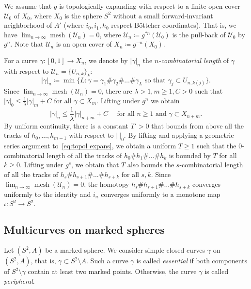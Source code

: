 \documentclass{amsart}
\theoremstyle{plain}
\theoremstyle{definition}
\theoremstyle{remark}
\renewcommand{\sp}{{\ \ }}
\newcommand{\UU}{{\mathcal U}}
\newcommand{\mesh}{{\operatorname{mesh}}}
\begin{document}
We assume that $g$ is topologically expanding with respect to a finite open cover $\UU_0$ of $X_0$, where $X_0$ is the sphere $S^2$ without a small forward-invariant neighborhood of $A'$ (where $i_0,i_1,h_0$ respect B\"{o}ttcher coordinates). That is, we have $\lim_{n\to\infty}\mesh(\UU_n)=0$, where $\UU_n\coloneq g^{*n}(\UU_0)$
is the pull-back of $\UU_0$ by $g^n$. Note that $\UU_n$ is an open cover of $X_n\coloneq g^{-n}(X_0)$.

For a curve $\gamma\colon [0,1]\to X_n$, we denote by $|\gamma|_n$ the \emph{$n$-combinatorial length} of $\gamma$ with respect to $\UU_n=\{U_{n,k}\}_k$: 
\[|\gamma|_n\coloneq \min \{L\colon  \gamma=\gamma_1\#\gamma_2\#\dots \#\gamma_L \text{ so that }\gamma_j\subset U_{n,k(j)}\}.\] Since $\lim_{n\to\infty}\mesh(\UU_n)=0$, there are $\lambda>1, m\ge 1, C>0$ such that $|\gamma|_0\le \frac 1 \lambda|\gamma|_m+C$ for all $\gamma\subset X_m$. Lifting under $g^n$ we obtain 
\begin{equation}
\label{eq:topol expans}
    |\gamma|_{n}\le \frac 1 \lambda |\gamma|_{n+m} +C \sp\sp\sp\text{for all }n\ge 1 \text{ and }\gamma\subset X_{n+m}.
\end{equation} 
By uniform continuity, there is a constant $T'>0$ that bounds from above all the tracks of $h_0, \dots, h_{m-1}$ with respect to $|\ |_0$. %
By lifting and applying a geometric series argument to~\eqref{eq:topol expans}, we obtain a uniform $T\ge1 $ such that the $0$-combinatorial length of all the tracks of $h_0\#h_{1}\#\dots \#h_{k}$ is bounded by $T$ for all $k\geq0$. Lifting under $g^s$, we obtain that $T$ also bounds the $s$-combinatorial length of all the tracks of $h_s\#h_{s+1}\#\dots \#h_{s+k}$ for all $s,k$. Since $\lim_{n\to\infty}\mesh(\UU_n)=0$, the homotopy $h_s\#h_{s+1}\#\dots \#h_{s+k}$ converges uniformly to the identity and $i_n$ converges uniformly to a monotone map $\iota\colon S^2\to S^2.$ 




\subsection{Multicurves on marked spheres}\label{ss:MC on marked sph}

Let $(S^2,A)$ be a marked sphere. We consider simple closed curves $\gamma$ on $(S^2,A)$, that is, $\gamma\subset S^2\setminus A$.  Such a curve $\gamma$ is called \emph{essential} if both components of $S^2\setminus \gamma$ contain at least two marked points.  Otherwise,  the curve $\gamma$ is called \emph{peripheral}.
\end{document}

